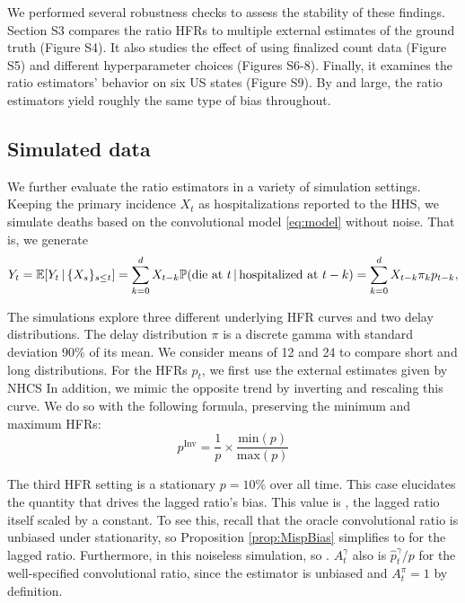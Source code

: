 \documentclass{article}
\renewcommand{\hat}{\widehat} %
\newcommand{\given}{\, \vert \,}
\begin{document}
We performed several robustness checks to assess the stability of these
findings. 
Section S3 compares the ratio HFRs to multiple external estimates of the ground truth (Figure S4). 
It also studies the effect of using finalized count data (Figure S5) and different hyperparameter choices (Figures S6-8).
Finally, it examines the ratio estimators' behavior on six US states (Figure S9). 
By and large, the ratio estimators yield roughly
the same type of bias throughout.


\subsection{Simulated data}
\label{sec:results_sim}

We further evaluate the ratio estimators in a variety of simulation settings. 
Keeping the primary incidence $X_t$ as hospitalizations reported to the HHS, we simulate deaths based on the convolutional model \eqref{eq:model} without noise. That is, we generate
\[
Y_t = \E[Y_t\given \{X_s\}_{s\leq t}] = \sum_{k=0}^d X_{t-k} \P(\text{die at $t$} \given \text{hospitalized at
  $t-k$}) = \sum_{k=0}^d X_{t-k} \pi_k p_{t-k},
\]

The simulations explore three different underlying HFR curves and two delay distributions. The delay distribution $\pi$ is a discrete gamma with
standard deviation 90\% of its mean. We consider means of 12 and 24 to
compare short and long distributions.
For the HFRs $p_t$, we first use the external estimates given by NHCS
In addition, we mimic the opposite trend by inverting and rescaling this curve. 
We do so with the following formula, preserving the minimum and maximum HFRs:
\[
p^\text{Inv} = \frac{1}{p}\times\frac{\text{min}(p)}{\text{max}(p)}
\]


The third HFR setting is a stationary $p=10\%$ over all time.
This case elucidates the quantity  that drives the lagged ratio's bias. This value is \smash{$A_t^\ell = \hat{p}_t^\ell/p$}, the lagged ratio itself scaled by a constant. 
To see this, recall that the oracle convolutional ratio is unbiased under stationarity, so Proposition \ref{prop:MispBias} simplifies to
\smash{$\E[\hat{p}_t^\ell \given \{X_s\}_{s\leq t}] = p A_t^\ell$} for the
lagged ratio. Furthermore, \smash{$\E[\hat{p}_t^\ell \given \{X_s\}_{s\leq t}]  
  = \hat{p}_t^\ell$} in this noiseless simulation, so \smash{$A_t^\ell = \hat{p}_t^\ell / p$}. 
$A_t^\gamma$ also is $\hat{p}_t^\gamma / p$ for the well-specified convolutional ratio, since the estimator is unbiased and $A_t^\pi=1$ by definition. 
\end{document}
